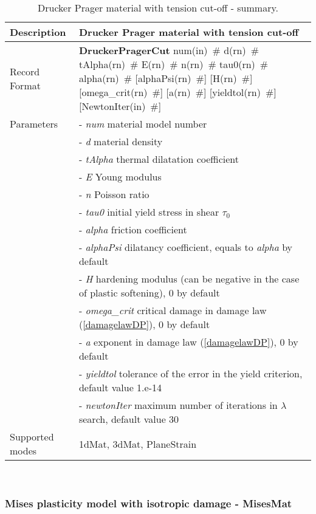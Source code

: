 \documentclass[a4paper]{article}
\newcommand{\descitem}[1]{{\noindent \bf #1}}
\newcommand{\elemparam}[2]{{{#1\tiny (#2)}~\#}}
\newcommand{\param}[1]{{\it #1}}
\newenvironment{mmt}{\begin{tabular}{|l|p{9cm}|}}{\end{tabular}\\}
\newenvironment{mmt}{\begin{tabular}{|l|l|}}{\end{tabular}\\}
\begin{document}
\begin{table}[!htb]
\begin{mmt}
\hline
Description & Drucker Prager material with tension cut-off\\
\hline
Record Format & \descitem{DruckerPragerCut} \elemparam{num}{in}
\elemparam{d}{rn} \elemparam{tAlpha}{rn} \elemparam{E}{rn} \elemparam{n}{rn} \elemparam{tau0}{rn} \elemparam{alpha}{rn} [\elemparam{alphaPsi}{rn}] [\elemparam{H}{rn}] [\elemparam{omega\_crit}{rn}] [\elemparam{a}{rn}] [\elemparam{yieldtol}{rn}] [\elemparam{NewtonIter}{in}]\\
Parameters &- \param{num} material model number\\
&- \param{d} material density\\
&- \param{tAlpha} thermal dilatation coefficient\\
&- \param{E} Young modulus\\
&- \param{n} Poisson ratio\\
&- \param{tau0} initial yield stress in shear $\tau_0$\\
&- \param{alpha} friction coefficient\\
&- \param{alphaPsi} dilatancy coefficient, equals to \param{alpha} by default\\
&- \param{H} hardening modulus (can be negative in the case of plastic softening), 0 by default\\ 
&- \param{omega\_crit} critical damage in damage law (\ref{damagelawDP}), 0 by default\\
&- \param{a} exponent in damage law (\ref{damagelawDP}), 0 by default\\
&- \param{yieldtol} tolerance of the error in the yield criterion, default value
1.e-14\\
&- \param{newtonIter} maximum number of iterations in $\lambda$ search, default value 30\\
Supported modes& 1dMat, 3dMat, PlaneStrain\\
\hline
\end{mmt}
\caption{Drucker Prager material with tension cut-off - summary.}
\label{DP_table_cut}
\end{table}

\clearpage
\subsubsection{Mises plasticity model with isotropic damage - MisesMat}
\label{sec:misplast}
\end{document}

